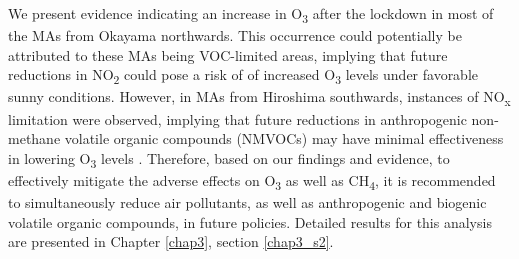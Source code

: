 We present evidence indicating an increase in O\textsubscript{3} after the lockdown in most of the MAs from Okayama northwards. This occurrence could potentially be attributed to these MAs being VOC-limited areas, implying that future reductions in NO\textsubscript{2} could pose a risk of of increased O\textsubscript{3} levels under favorable sunny conditions. However, in MAs from Hiroshima southwards, instances of NO\textsubscript{x} limitation were observed, implying that future reductions in anthropogenic non-methane volatile organic compounds (NMVOCs) may have minimal effectiveness in lowering O\textsubscript{3} levels \citep{akimoto2022rethinking}. Therefore, based on our findings and evidence, to effectively mitigate the adverse effects on O\textsubscript{3} as well as CH\textsubscript{4}, it is recommended to simultaneously reduce air pollutants, as well as anthropogenic and biogenic volatile organic compounds, in future policies. Detailed results for this analysis are presented in Chapter \ref{chap3}, section \ref{chap3_s2}. \par

